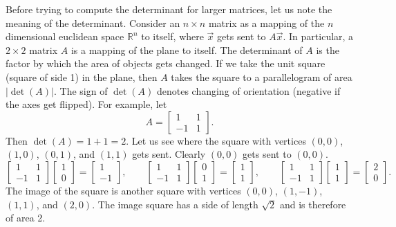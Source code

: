 \documentclass[12pt]{book}
\begin{document}
Before trying to compute the
determinant for larger matrices, let us note
the meaning of the determinant.  Consider an $n \times n$ matrix
as a mapping of the $n$ dimensional euclidean space ${\mathbb{R}}^n$ to 
itself, where $\vec{x}$ gets sent to $A \vec{x}$.
In particular, a $2 \times 2$ matrix $A$ is a mapping of
the plane to itself.  The
determinant of 
$A$ is the factor by which the area of objects gets changed. 
If we take the unit square (square of side 1) in the plane, then
$A$ takes the square to a parallelogram of area $\lvert\det(A)\rvert$.  The sign
of $\det(A)$ denotes changing of orientation (negative if the axes get flipped).  For
example, let
\begin{equation*}
A =
\begin{bmatrix}
1 & 1 \\
-1 & 1
\end{bmatrix} .
\end{equation*}
Then $\det(A) = 1+1 = 2$.  Let us see where the square with vertices
$(0,0)$, $(1,0)$, $(0,1)$, and $(1,1)$ gets sent.  Clearly $(0,0)$ gets sent
to $(0,0)$.  
\begin{equation*}
\begin{bmatrix}
1 & 1 \\
-1 & 1
\end{bmatrix}
\begin{bmatrix}
1 \\ 0
\end{bmatrix} =
\begin{bmatrix}
1 \\
-1 
\end{bmatrix}
,
\qquad
\begin{bmatrix}
1 & 1 \\
-1 & 1
\end{bmatrix}
\begin{bmatrix}
0 \\ 1
\end{bmatrix} =
\begin{bmatrix}
1 \\
1 
\end{bmatrix}
,
\qquad
\begin{bmatrix}
1 & 1 \\
-1 & 1
\end{bmatrix}
\begin{bmatrix}
1 \\ 1
\end{bmatrix} =
\begin{bmatrix}
2 \\
0 
\end{bmatrix}
.
\end{equation*}
The image of the square is another square with vertices $(0,0)$, $(1,-1)$,
$(1,1)$, and $(2,0)$.  The
image square has
a side of length $\sqrt{2}$ and is therefore of area 2.
\end{document}

